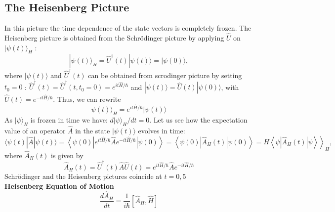 \subsection{The Heisenberg Picture}
In this picture the time dependence of the state vectors is completely frozen. The Heisenberg picture is obtained from the Schrödinger picture by applying $\hat{U}$ on $|\psi(t)\rangle_{H}$ :
$$
|\psi(t)\rangle_{H}=\hat{U}^{\dagger}(t)|\psi(t)\rangle=|\psi(0)\rangle,
$$
where $|\psi(t)\rangle$ and $\hat{U}^{\dagger}(t)$ can be obtained from scrodinger picture by setting $t_{0}=0$ : $\hat{U}^{\dagger}(t)=\hat{U}^{\dagger}\left(t, t_{0}=0\right)=e^{i t \hat{H} / \hbar}$ and $|\psi(t)\rangle=\hat{U}(t)|\psi(0)\rangle$, with $\hat{U}(t)=e^{-i t \hat{H} / \hbar}$. Thus, we can rewrite \\
$$\psi(t)\rangle_{H}=e^{i t \hat{H} / \hbar}|\psi(t)\rangle$$
As $|\psi\rangle_{H}$ is frozen in time we have: $d|\psi\rangle_{H} / d t=0$. Let us see how the expectation value of an operator $\hat{A}$ in the state $|\psi(t)\rangle$ evolves in time:
$$
\left.\langle\psi(t)|\hat{A}| \psi(t)\rangle=\left\langle\psi(0)\left|e^{i t \hat{H} / \hbar} \hat{A} e^{-i t \hat{H} / \hbar}\right| \psi(0)\right\rangle=\left\langle\psi(0)\left|\hat{A}_{H}(t)\right| \psi(0)\right\rangle=H\left\langle\psi\left|\hat{A}_{H}(t)\right| \psi\right\rangle\right\rangle_{H},
$$
where $\hat{A}_{H}(t)$ is given by\\
$$\hat{A}_{H}(t)=\hat{U}^{\dagger}(t) \hat{A} \hat{U}(t)=e^{i t \hat{H} / \hbar} \hat{A} e^{-i t \hat{H} / \hbar}$$
Schrödinger and the Heisenberg pictures coincide at $t=0,5$ \\
\textbf{Heisenberg Equation of Motion}\\
$$\frac{d\hat{A}_H}{dt}=\frac{1}{i\hbar}\left[\hat{A}_H,\hat{H}\right] $$ 

